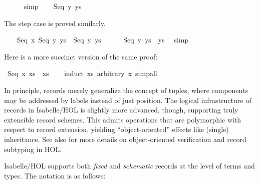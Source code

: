 \begin{isabellebody}
\ \ \ \ \isamarkupfalse%
\ simp\isanewline
{}\isamarkupfalse%
\isanewline
\ \ \isamarkupfalse%
\ {}Seq\ y\ ys{}%
\begin{isamarkuptxt}%
The step case is proved similarly.%
\end{isamarkuptxt}%
\isamarkuptrue%
\ \ \isamarkupfalse%
\ {}Seq\ x\ {}Seq\ y\ ys{}\ {}\ Seq\ y\ ys{}\isanewline
\ \ \ \ \isamarkupfalse%
\ {}Seq\ y\ ys\ {}\ ys{}\ \isamarkupfalse%
\ simp\isanewline
{}\isamarkupfalse%
%
\endisatagproof
{\isafoldproof}%
%
\isadelimproof
%
\endisadelimproof
%
\begin{isamarkuptext}%
Here is a more succinct version of the same proof:%
\end{isamarkuptext}%
\isamarkuptrue%
\isamarkupfalse%
\ {}Seq\ x\ xs\ {}\ xs{}\isanewline
%
\isadelimproof
\ \ %
\endisadelimproof
%
\isatagproof
{}\isamarkupfalse%
\ {}induct\ xs\ arbitrary{}\ x{}\ simp{}all%
\endisatagproof
{\isafoldproof}%
%
\isadelimproof
%
\endisadelimproof
%
\isamarkuptrue%
%
\begin{isamarkuptext}%
In principle, records merely generalize the concept of tuples, where
  components may be addressed by labels instead of just position.  The
  logical infrastructure of records in Isabelle/HOL is slightly more
  advanced, though, supporting truly extensible record schemes.  This
  admits operations that are polymorphic with respect to record
  extension, yielding ``object-oriented'' effects like (single)
  inheritance.  See also \cite{NaraschewskiW-TPHOLs98} for more
  details on object-oriented verification and record subtyping in HOL.%
\end{isamarkuptext}%
\isamarkuptrue%
%
\isamarkuptrue%
%
\begin{isamarkuptext}%
Isabelle/HOL supports both \emph{fixed} and \emph{schematic} records
  at the level of terms and types.  The notation is as follows:


\end{isamarkuptext}
\end{isabellebody}
